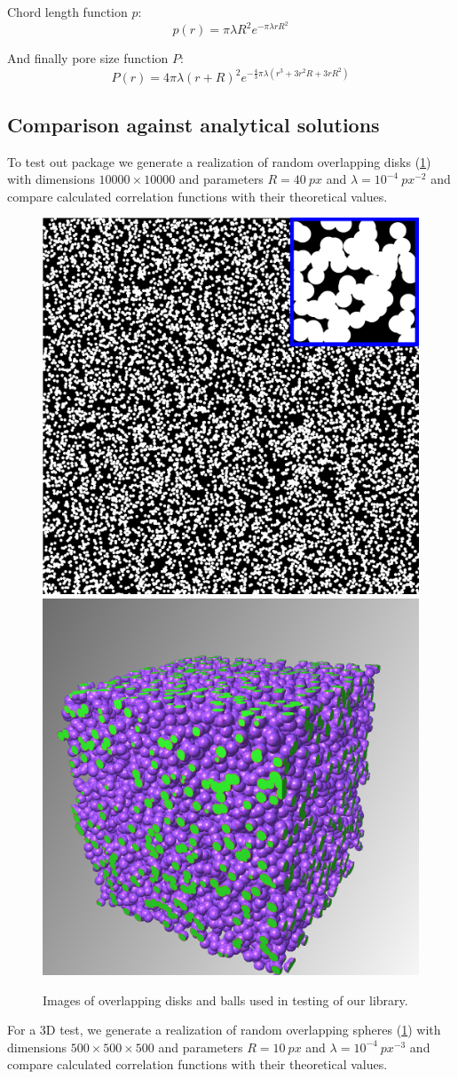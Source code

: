 \documentclass[reprint,amsmath,amssymb,aps,pre,showkeys,showpacs,nofootinbib]{revtex4-1}
\begin{document}
Chord length function $p$:
\begin{equation*}
  p(r) = \pi\lambda R^2 e^{-\pi\lambda rR^2}
\end{equation*}

And finally pore size function $P$:
\begin{equation*}
  P(r) = 4\pi\lambda(r+R)^2 e^{-\frac{4}{3}\pi\lambda (r^3 + 3r^2R + 3rR^2)}
\end{equation*}

\subsection{Comparison against analytical solutions}
To test out package we generate a realization of random overlapping disks
(\cref{fig:overlapping-disks}) with dimensions $10000 \times 10000$ and
parameters $R = 40\ px$ and $\lambda = 10^{-4}\ px^{-2}$ and compare calculated
correlation functions with their theoretical values.
\begin{figure}[ht]
  \centering
  \includegraphics[width=0.45\linewidth]{images/disks.png}
  \includegraphics[width=0.45\linewidth]{images/balls.png}
  \caption[]{Images of overlapping disks and balls used in testing of our library.}
  \label{fig:overlapping-disks}
\end{figure}

For a 3D test, we generate a realization of random overlapping spheres
(\cref{fig:overlapping-disks}) with dimensions $500 \times 500 \times 500$ and
parameters $R = 10\ px$ and $\lambda = 10^{-4}\ px^{-3}$ and compare calculated
correlation functions with their theoretical values. 
\end{document}
